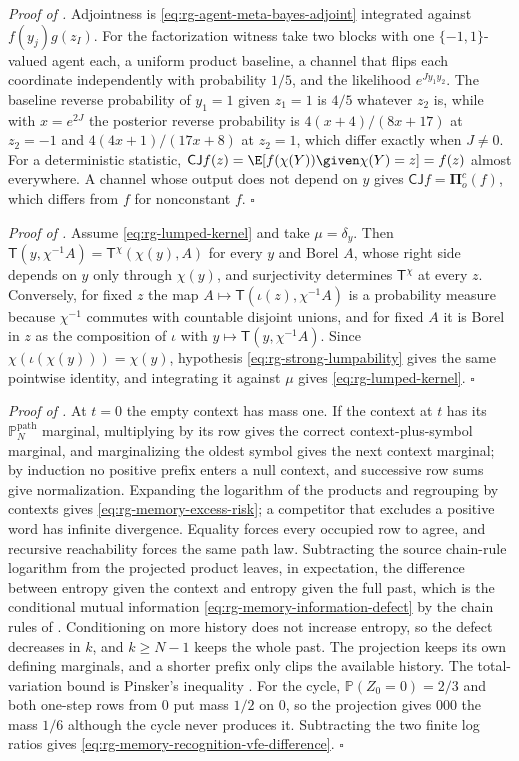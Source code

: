 \noindent\emph{Proof of .}
Adjointness is \eqref{eq:rg-agent-meta-bayes-adjoint} integrated against
$f(y_j)g(z_I)$. For the factorization witness take two blocks with one
$\{-1,1\}$-valued agent each, a uniform product baseline, a channel that flips each
coordinate independently with probability $1/5$, and the likelihood
$e^{Jy_1y_2}$. The baseline reverse probability of $y_1=1$ given $z_1=1$ is $4/5$
whatever $z_2$ is, while with $x=e^{2J}$ the posterior reverse probability is
$4(x+4)/(8x+17)$ at $z_2=-1$ and $4(4x+1)/(17x+8)$ at $z_2=1$, which differ exactly
when $J\ne0$. For a deterministic statistic, $\mathsf C\mathsf
Jf(z)=\E[f(\chi(Y))\given\chi(Y)=z]=f(z)$ almost everywhere. A channel whose output
does not depend on $y$ gives $\mathsf C\mathsf Jf=\boldsymbol\Pi^c_o(f)$, which
differs from $f$ for nonconstant $f$. $\square$

\noindent\emph{Proof of .}
Assume \eqref{eq:rg-lumped-kernel} and take $\mu=\delta_y$. Then
$\mathsf T(y,\chi^{-1}A)=\mathsf T^\chi(\chi(y),A)$ for every $y$ and Borel $A$,
whose right side depends on $y$ only through $\chi(y)$, and surjectivity determines
$\mathsf T^\chi$ at every $z$. Conversely, for fixed $z$ the map
$A\mapsto\mathsf T(\iota(z),\chi^{-1}A)$ is a probability measure because $\chi^{-1}$
commutes with countable disjoint unions, and for fixed $A$ it is Borel in $z$ as the
composition of $\iota$ with $y\mapsto\mathsf T(y,\chi^{-1}A)$. Since
$\chi(\iota(\chi(y)))=\chi(y)$, hypothesis \eqref{eq:rg-strong-lumpability} gives the
same pointwise identity, and integrating it against $\mu$ gives
\eqref{eq:rg-lumped-kernel}. $\square$

\noindent\emph{Proof of .}
At $t=0$ the empty context has mass one. If the context at $t$ has its
$\mathbb P^{\mathrm{path}}_N$ marginal, multiplying by its row gives the correct
context-plus-symbol marginal, and marginalizing the oldest symbol gives the next
context marginal; by induction no positive prefix enters a null context, and
successive row sums give normalization. Expanding the logarithm of the products and
regrouping by contexts gives \eqref{eq:rg-memory-excess-risk}; a competitor that
excludes a positive word has infinite divergence. Equality forces every occupied row
to agree, and recursive reachability forces the same path law. Subtracting the
source chain-rule logarithm from the projected product leaves, in expectation, the
difference between entropy given the context and entropy given the full past, which
is the conditional mutual information \eqref{eq:rg-memory-information-defect} by the
chain rules of \citet[Sec.~2.5]{CoverThomas2006}. Conditioning on more history does
not increase entropy, so the defect decreases in $k$, and $k\ge N-1$ keeps the whole
past. The projection keeps its own defining marginals, and a shorter prefix only
clips the available history. The total-variation bound is Pinsker's inequality
\citep[Lemma~11.6.1]{CoverThomas2006}. For the cycle,
$\mathbb P(Z_0=0)=2/3$ and both one-step rows from $0$ put mass $1/2$ on $0$, so the
projection gives $000$ the mass $1/6$ although the cycle never produces it.
Subtracting the two finite log ratios gives
\eqref{eq:rg-memory-recognition-vfe-difference}. $\square$

